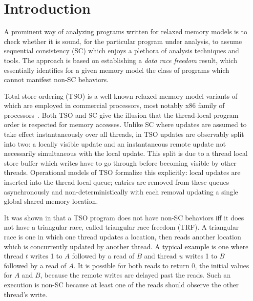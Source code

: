 \documentclass[preprint,9pt]{sigplanconf}
\begin{document}





\section{Introduction}
\label{sec:intro}
A prominent way of analyzing programs written for relaxed memory models is to check whether it is sound, for the particular program under analysis, to assume sequential consistency (SC) which enjoys a plethora of analysis techniques and tools.
The approach is based on establishing a {\em data race freedom} result, which essentially identifies for a given memory model the class of programs which cannot manifest non-SC behaviors.

Total store ordering (TSO) is a well-known relaxed memory model variants of which are employed in commercial processors, most notably x86 family of processors~\cite{SSO+2010}.
Both TSO and SC give the illusion that the thread-local program order is respected for memory accesses.
Unlike SC where updates are assumed to take effect instantaneously over all threads, in TSO updates are observably split into two: a locally visible update and an instantaneous remote update not necessarily simultaneous with the local update.
This split is due to a thread local store buffer which writes have to go through before becoming visible by other threads.
Operational models of TSO formalize this explicitly: local updates are inserted into the thread local queue; entries are removed from these queues asynchronously and non-deterministically with each removal updating a single global shared memory location. 

It was shown in \cite{Owe2010} that a TSO program does not have non-SC behaviors iff it does not have a triangular race, called triangular race freedom (TRF).
A triangular race is one in which one thread updates a location, then reads another location which is concurrently updated by another thread.
A typical example is one where thread $t$ writes 1 to $A$ followed by a read of $B$ and thread $u$ writes 1 to $B$ followed by a read of $A$.
It is possible for both reads to return 0, the initial values for $A$ and $B$, because the remote writes are delayed past the reads.
Such an execution is non-SC because at least one of the reads should observe the other thread's write.
\end{document}

